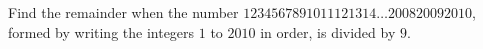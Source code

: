 Find the remainder when the number $1234567891011121314\ldots200820092010$, formed by writing the integers $1$ to $2010$ in order, is divided by $9$.
